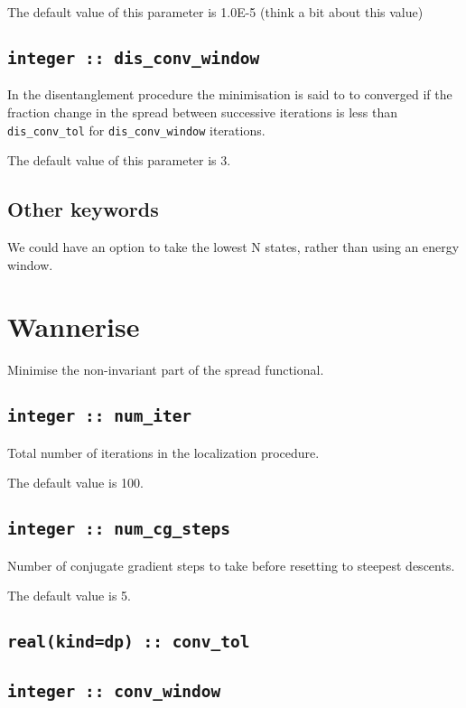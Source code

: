 The default value of this parameter is 1.0E-5 (think a bit about this value)


\subsection[dis\_conv\_window]{\tt integer :: dis\_conv\_window}

In the disentanglement procedure the minimisation is said to to converged
if the fraction change in the spread between successive
iterations is less than
\verb#dis_conv_tol# for \verb#dis_conv_window# iterations.

The default value of this parameter is 3.


\subsection{Other keywords}
 We could have an option to take the lowest N states, rather than using
 an energy window.



\section{Wannerise}
Minimise the non-invariant part of the spread functional.

\subsection[num\_iter]{\tt integer :: num\_iter}

Total number of iterations in the localization procedure.

The default value is 100.

\subsection[num\_cg\_steps]{\tt integer :: num\_cg\_steps}

Number of conjugate gradient steps to take before resetting to steepest descents.

The default value is 5.

\subsection[conv\_tol]{\tt real(kind=dp) :: conv\_tol}


\subsection[conv\_window]{\tt integer :: conv\_window}

